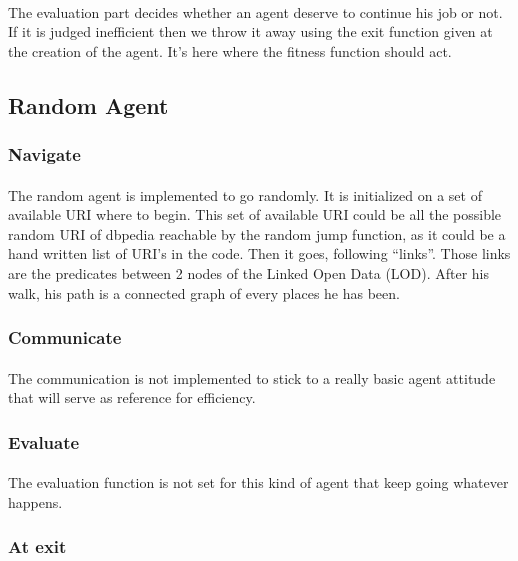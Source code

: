 \documentclass{article}
\begin{document}
		\paragraph{}
			The evaluation part decides whether an agent deserve to continue his job or not.
			If it is judged inefficient then we throw it away using the exit function given at the creation of the agent.
			It's here where the fitness function should act.
	\subsection{Random Agent}
		\subsubsection{Navigate}
			\paragraph{}
				The random agent is implemented to go randomly.
				It is initialized on a set of available URI where to begin.
				This set of available URI could be all the possible random URI of dbpedia reachable by the random jump function,
				as it could be a hand written list of URI's in the code.
				Then it goes, following ``links''.
				Those links are the predicates between 2 nodes of the Linked Open Data (LOD).
				After his walk, his path is a connected graph of every places he has been.
		\subsubsection{Communicate}
			\paragraph{}
				The communication is not implemented to stick to a really basic agent attitude that will serve as reference for efficiency.
		\subsubsection{Evaluate}
			\paragraph{}
				The evaluation function is not set for this kind of agent that keep going whatever happens.
		\subsubsection{At exit}
\end{document}
